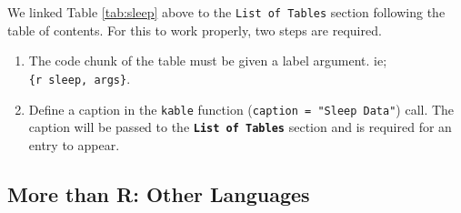 \documentclass[12pt,oneside]{chicagocapstone}
\providecommand{\tightlist}{%
  \setlength{\itemsep}{0pt}\setlength{\parskip}{0pt}}
\begin{document}
We linked Table \ref{tab:sleep} above to the \texttt{List\ of\ Tables} section following the table of contents. For this to work properly, two steps are required.
\begin{enumerate}
\def\labelenumi{\arabic{enumi}.}
\tightlist
\item
  The code chunk of the table must be given a label argument. ie; \texttt{\{r\ sleep,\ args\}}.
\item
  Define a caption in the \texttt{kable} function (\texttt{caption\ =\ "Sleep\ Data"}) call. The caption will be passed to the \textbf{\texttt{List\ of\ Tables}} section and is required for an entry to appear.
\end{enumerate}
\hypertarget{more-than-r-other-languages}{%
\subsection*{More than R: Other Languages}\label{more-than-r-other-languages}}
\end{document}
